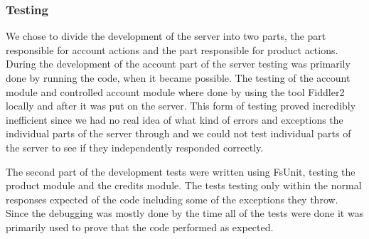 \subsubsection{Testing}
We chose to divide the development of the server into two parts, the part responsible for account actions and the part responsible for product actions. During the development of the account part of the server testing was primarily done by running the code, when it became possible. The testing of the account module and controlled account module where done by using the tool Fiddler2 locally and after it was put on the server. This form of testing proved incredibly inefficient since we had no real idea of what kind of errors and exceptions the individual parts of the server through and we could not test individual parts of the server to see if they independently responded correctly.

The second part of the development tests were written using FsUnit, testing the product module and the credits module. The tests testing only within the normal responses expected of the code including some of the exceptions they throw. Since the debugging was mostly done by the time all of the tests were done it was primarily used to prove that the code performed as expected.